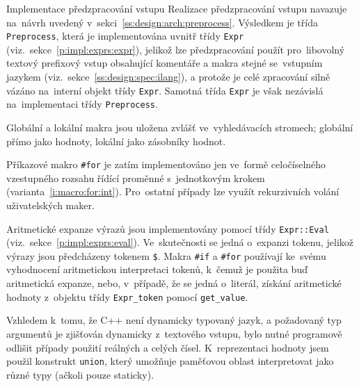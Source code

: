 \documentclass[thesis=M,czech]{FITthesis}[2012/06/26]
\newcommand{\id}[1]{\texttt{#1}}
\newcommand{\rf}[1]{\ref{#1}}
\begin{document}
\begin{section}{Implementace předzpracování vstupu}\label{s:impl:preprocess}
Realizace předzpracování vstupu navazuje na~návrh
uvedený v~sekci~\rf{ss:design:arch:preprocess}.
Výsledkem je třída \id{Preprocess},
která je implementována uvnitř třídy \id{Expr}
(viz.~sekce~\rf{p:impl:exprs:expr}),
jelikož lze předzpracování použít pro~libovolný textový prefixový vstup
obsahující komentáře a makra stejné se~vstupním jazykem
(viz.~sekce~\rf{ss:design:spec:ilang}),
a protože je celé zpracování silně vázáno na~interní objekt třídy \id{Expr}.
Samotná třída \id{Expr} je však nezávislá
na~implementaci třídy \id{Preprocess}.

Globální a lokální makra jsou uložena zvlášť
ve~vyhledávacích stromech;
globální přímo jako hodnoty,
lokální jako zásobníky hodnot.

Příkazové makro \id{\#for} je zatím implementováno
jen ve~formě celočíselného vzestupného rozsahu
řídící proměnné s~jednotkovým krokem
(varianta~\rf{i:macro:for:int}).
Pro~ostatní případy lze využít rekurzivních volání uživatelských maker.


\begin{paragraph}{Aritmetické expanze}
\label{s:impl:preprocess:arith}
výrazů jsou implementovány pomocí třídy \id{Expr::\-Eval}
(viz.~sekce~\rf{p:impl:exprs:eval}).
Ve~skutečnosti se jedná o~expanzi tokenu,
jelikož výrazy jsou předcházeny tokenem \id{\$}.
Makra \id{\#if} a \id{\#for} používají
ke~svému vyhodnocení
aritmetickou interpretaci tokenů,
k~čemuž je použita buď aritmetická expanze,
nebo, v~případě, že se jedná o~literál,
získání aritmetické hodnoty z~objektu třídy
\id{Expr\_\-token} pomocí \id{get\_\-value}.

Vzhledem k~tomu, že C++ není dynamicky typovaný jazyk,
a požadovaný typ argumentů je zjišťován dynamicky z~textového vstupu,
bylo nutné programově odlišit případy použití
reálných a celých čísel.
K~reprezentaci hodnoty jsem použil
konstrukt \id{union},
který umožňuje paměťovou oblast
interpretovat jako různé typy (ačkoli pouze staticky).
\end{paragraph} %



\end{section}
\end{document}
